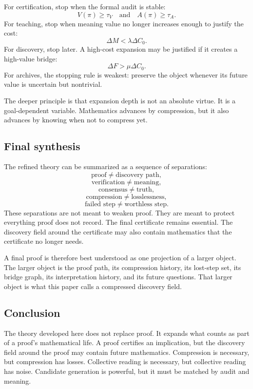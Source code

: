 \documentclass[11pt]{article}
\theoremstyle{definition}
\theoremstyle{remark}
\begin{document}
For certification, stop when the formal audit is stable:
\[
        V(\pi)\ge \tau_V
        \quad\text{and}\quad
        A(\pi)\ge \tau_A.
\]
For teaching, stop when meaning value no longer increases enough to justify the cost:
\[
        \Delta M < \lambda\Delta C_0.
\]
For discovery, stop later.  A high-cost expansion may be justified if it creates a high-value bridge:
\[
        \Delta F > \mu\Delta C_0.
\]
For archives, the stopping rule is weakest: preserve the object whenever its future value is uncertain but nontrivial.

The deeper principle is that expansion depth is not an absolute virtue.  It is a goal-dependent variable.  Mathematics advances by compression, but it also advances by knowing when not to compress yet.

\subsection{Final synthesis}

The refined theory can be summarized as a sequence of separations:
\[
        \text{proof}\ne\text{discovery path},
\]
\[
        \text{verification}\ne\text{meaning},
\]
\[
        \text{consensus}\ne\text{truth},
\]
\[
        \text{compression}\ne\text{losslessness},
\]
\[
        \text{failed step}\ne\text{worthless step}.
\]
These separations are not meant to weaken proof.  They are meant to protect everything proof does not record.  The final certificate remains essential.  The discovery field around the certificate may also contain mathematics that the certificate no longer needs.

A final proof is therefore best understood as one projection of a larger object.  The larger object is the proof path, its compression history, its lost-step set, its bridge graph, its interpretation history, and its future questions.  That larger object is what this paper calls a compressed discovery field.

\subsection{Conclusion}

The theory developed here does not replace proof.  It expands what counts as part of a proof's mathematical life.  A proof certifies an implication, but the discovery field around the proof may contain future mathematics.  Compression is necessary, but compression has losses.  Collective reading is necessary, but collective reading has noise.  Candidate generation is powerful, but it must be matched by audit and meaning.
\end{document}
